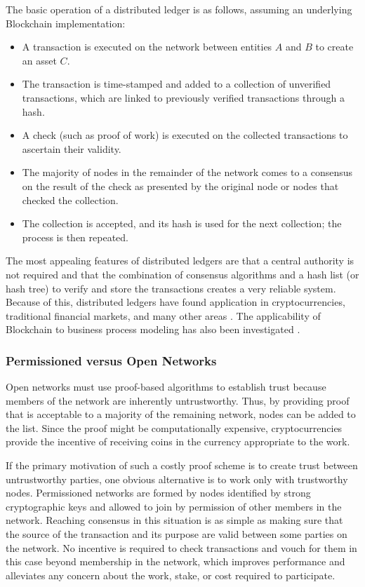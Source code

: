 \documentclass[sigconf]{acmart}
\begin{document}
The basic operation of a distributed ledger is as follows, assuming an underlying Blockchain implementation:
\begin{itemize}
    \item A transaction is executed on the network between entities $A$ and $B$ to create an asset $C$.
    \item The transaction is time-stamped and added to a collection of unverified transactions, which are linked to previously verified transactions through a hash.
    \item A check (such as proof of work) is executed on the collected transactions to ascertain their validity. 
    \item The majority of nodes in the remainder of the network comes to a consensus on the result of the check as presented by the original node or nodes that checked the collection.
    \item The collection is accepted, and its hash is used for the next collection; the process is then repeated.
\end{itemize}

The most appealing features of distributed ledgers are that a central authority is not required and that the combination of consensus algorithms and a hash list (or hash tree) to verify and store the transactions creates a very reliable system. Because of this, distributed ledgers have found application in cryptocurrencies, traditional financial markets, and many other areas \cite{noauthor_groups:requirements:use-case-inventory_nodate} \cite{noauthor_discussion_2018}. The applicability of Blockchain to business process modeling has also been investigated \cite{Mendling:2018:BBP:3146385.3183367}.

\subsubsection{Permissioned versus Open Networks}
Open networks must use proof-based algorithms to establish trust because members of the network are inherently untrustworthy. Thus, by providing proof that is acceptable to a majority of the remaining network, nodes can be added to the list. Since the proof might be computationally expensive, cryptocurrencies provide the incentive of receiving coins in the currency appropriate to the work.

If the primary motivation of such a costly proof scheme is to create trust between untrustworthy parties, one obvious alternative is to work only with trustworthy nodes. Permissioned networks are formed by nodes identified by strong cryptographic keys and allowed to join by permission of other members in the network. Reaching consensus in this situation is as simple as making sure that the source of the transaction and its purpose are valid between some parties on the network. No incentive is required to check transactions and vouch for them in this case beyond membership in the network, which improves performance and alleviates any concern about the work, stake, or cost required to participate.
\end{document}
